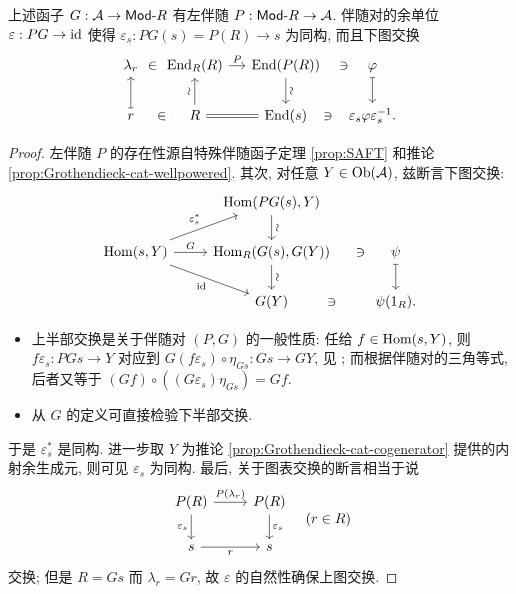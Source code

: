 \begin{lemma}\label{prop:GP-prep}
	上述函子 $G: \mathcal{A} \to \mathsf{Mod}\text{-}R$ 有左伴随 $P: \mathsf{Mod}\text{-}R \to \mathcal{A}$. 伴随对的余单位 $\varepsilon: PG \to \mathrm{id}$ 使得 $\varepsilon_s: PG(s) = P(R) \to s$ 为同构, 而且下图交换
	\[\begin{tikzcd}[column sep=small]
		\lambda_r \arrow[phantom, r, "\in" description] & \End_R(R) \arrow[r, "P"] & \End(P(R)) \arrow[d, "\sim" sloped] & \varphi \arrow[phantom, l, "\ni" description] \arrow[mapsto, d] \\
		r \arrow[phantom, r, "\in" description] \arrow[mapsto, u] & R \arrow[u, "\sim" sloped] \arrow[equal, r] & \End(s) & \varepsilon_s \varphi \varepsilon_s^{-1} \arrow[phantom, l, "\ni" description] .
	\end{tikzcd}\]
\end{lemma}
\begin{proof}
	左伴随 $P$ 的存在性源自特殊伴随函子定理 \ref{prop:SAFT} 和推论 \ref{prop:Grothendieck-cat-wellpowered}. 其次, 对任意 $Y \in \operatorname{Ob}(\mathcal{A})$, 兹断言下图交换:
	\[\begin{tikzcd}
		& \Hom(PG(s), Y) \arrow[d, "\sim" sloped] & \\
		\Hom(s, Y) \arrow[ru, "{\varepsilon_s^*}"] \arrow[r, "G"] \arrow[rd, "\identity"'] & \Hom_R(G(s), G(Y)) \arrow[d, "\sim" sloped] & \psi \arrow[phantom, l, "\ni" description, sloped] \arrow[mapsto, d] \\
		& G(Y) & \psi(1_R). \arrow[phantom, l, "\ni" description, sloped]
	\end{tikzcd}\]
	\begin{itemize}
		\item 上半部交换是关于伴随对 $(P, G)$ 的一般性质: 任给 $f \in \operatorname{Hom}(s, Y)$, 则 $f\varepsilon_s: PGs \to Y$ 对应到 $G(f\varepsilon_s) \circ \eta_{Gs}: Gs \to GY$, 见 \cite[(2.5)]{Li1}; 而根据伴随对的三角等式, 后者又等于 $(Gf) \circ \left((G\varepsilon_s) \eta_{Gs}\right) = Gf$.
		\item 从 $G$ 的定义可直接检验下半部交换.
	\end{itemize}
	
	于是 $\varepsilon_s^*$ 是同构. 进一步取 $Y$ 为推论 \ref{prop:Grothendieck-cat-cogenerator} 提供的内射余生成元, 则可见 $\varepsilon_s$ 为同构. 最后, 关于图表交换的断言相当于说
	\[\begin{tikzcd}
		P(R) \arrow[r, "{P(\lambda_r)}"] \arrow[d, "{\varepsilon_s}"'] & P(R) \arrow[d, "{\varepsilon_s}"] \\
		s \arrow[r, "r"'] & s
	\end{tikzcd} \quad (r \in R) \]
	交换; 但是 $R = Gs$ 而 $\lambda_r = Gr$, 故 $\varepsilon$ 的自然性确保上图交换.
\end{proof}

